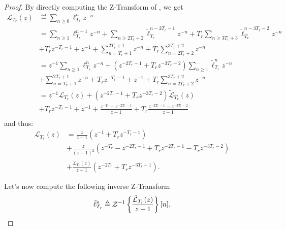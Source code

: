 \documentclass{article}
\begin{document}
    \begin{proof}
      By directly computing the Z-Transform of , we get
      \begin{align}
        \mathcal{L}_{T_r}(z) & \eqdef \sum_{n \geq 0} \ell_{T_r}^{n} z^{-n} \\
        & = \sum_{n \geq 1} \ell_{T_r}^{n-1} z^{-n} + \sum_{n \geq 2T_r + 2} \tilde{\ell}_{T_r}^{n-2T_r-1} z^{-n} + T_r \sum_{n \geq 3T_r + 3} \tilde{\ell}_{T_r}^{n-3T_r-2} z^{-n} \\
        \nonumber & + T_r z^{-T_r - 1} + z^{-1} + \sum_{n =T_r+1}^{2T_r + 1} z^{-n} + T_r \sum_{n =2T_r+2}^{3T_r + 2} z^{-n} \\
        & = z^{-1} \sum_{n \geq 1} \ell_{T_r}^{n} z^{-n} + \left(z^{-2T_r-1} + T_r z^{-3T_r-2}\right) \sum_{n \geq 1} \tilde{\ell}_{T_r}^{n} z^{-n} \\
        \nonumber & + \sum_{n =T_r+1}^{2T_r + 1} z^{-n} + T_r z^{-T_r - 1} + z^{-1} + T_r \sum_{n =2T_r+2}^{3T_r + 2} z^{-n} \\
        & = z^{-1} \mathcal{L}_{T_r}(z) + \left(z^{-2T_r-1} + T_r z^{-3T_r-2}\right) \tilde{\mathcal{L}}_{T_r}(z) \\
        \nonumber & +  T_r z^{-T_r - 1} + z^{-1} + \frac{z^{-T_r} - z^{-2T_r-1}}{z-1} + T_r \frac{z^{-2T_r-1} - z^{-3T_r-2}}{z-1} \\
      \end{align}
      and thus:
      \begin{align}
        \mathcal{L}_{T_r}(z)
        & = \frac{z}{z-1} (z^{-1} + T_r z^{-T_r-1}) \\
        \nonumber & + \frac{z}{(z-1)^2} (z^{-T_r} - z^{-2T_r-1} + T_r z^{-2T_r-1} - T_r z^{-3T_r-2})  \\
        \nonumber & + \frac{\tilde{\mathcal{L}}_{T_r}(z)}{z-1}(z^{-2T_r} + T_r z^{-3T_r-1}).
      \end{align}

      Let's now compute the following inverse Z-Transform
      \begin{equation}
        \bar{\ell}_{T_r}^{n} \triangleq \mathcal{Z}^{-1}\left\{\frac{\tilde{\mathcal{L}}_{T_r}(z)}{z-1}\right\}[n].
      \end{equation}
      

\end{proof}
\end{document}
